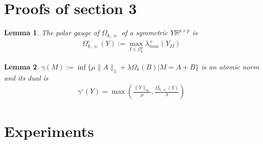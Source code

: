 \documentclass{article}
\def\RR{\mathbb{R}}
\newtheorem{lemm}{Lemma}
\begin{document}
\section{Proofs of section 3}

\begin{lemm} The polar gauge of $\Omega_{k,\succeq}$ of a symmetric $Y\RR^{p\times p}$ is
\begin{align}
\Omega_{k,\succeq}^{\circ}(Y):= \max_{I\in\mathcal{G}^p_k}\lambda^{+}_{max}(Y_{II})
\end{align}
\end{lemm}

\begin{lemm} $\gamma(M):=\inf\{\mu\|A\|_{1}+\lambda\Omega_k(B)|M=A+B\}$ is an atomic norm and its dual is 
\begin{align*}
\gamma^{\circ}(Y)=\max\left(\frac{\|Y\|_{\infty}}{\mu},\frac{\Omega_{k,\succeq}^{\circ}(Y)}{\lambda}\right)
\end{align*}
\end{lemm}

\section{Experiments}
\end{document}
